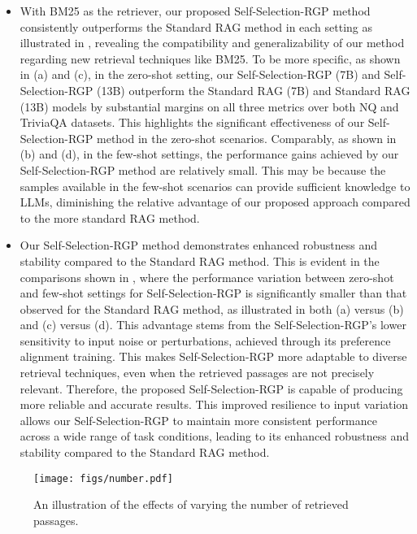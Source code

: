 \begin{itemize}[leftmargin=*,nosep]
\item  With BM25 as the retriever, our proposed Self-Selection-RGP method consistently outperforms the Standard RAG method in each setting as illustrated in , revealing the compatibility and generalizability of our method regarding new retrieval techniques like BM25.
To be more specific, as shown in  (a) and (c), in the zero-shot setting, our Self-Selection-RGP (7B) and Self-Selection-RGP (13B) outperform the Standard RAG (7B) and Standard RAG (13B) models by substantial margins on all three metrics over both NQ and TriviaQA datasets. 
This highlights the significant effectiveness of our Self-Selection-RGP method in the zero-shot scenarios.
Comparably, as shown in  (b) and (d), in the few-shot settings, the performance gains achieved by our Self-Selection-RGP method are relatively small. 
This may be because the samples available in the few-shot scenarios can provide sufficient knowledge to LLMs, diminishing the relative advantage of our proposed approach compared to the more standard RAG method.

\item Our Self-Selection-RGP method demonstrates enhanced robustness and stability compared to the Standard RAG method. 
This is evident in the comparisons shown in , where the performance variation between zero-shot and few-shot settings for Self-Selection-RGP is significantly smaller than that observed for the Standard RAG method, as illustrated in both (a) versus (b) and (c) versus (d). 
This advantage stems from the Self-Selection-RGP's lower sensitivity to input noise or perturbations, achieved through its preference alignment training.
This makes Self-Selection-RGP more adaptable to diverse retrieval techniques, even when the retrieved passages are not precisely relevant. 
Therefore, the proposed Self-Selection-RGP is capable of producing more reliable and accurate results.
This improved resilience to input variation allows our Self-Selection-RGP to maintain more consistent performance across a wide range of task conditions, leading to its enhanced robustness and stability compared to the Standard RAG method. 
\end{itemize}

\begin{figure}[t]
\setlength\abovecaptionskip{-0.3px}
\setlength\belowcaptionskip{-8px}
  \centering
  \texttt{[image: figs/number.pdf]}
  \caption{An illustration of the effects of varying the number of retrieved passages. } 
  \label{fig:num_passage}
  \vspace{-0.2cm}
\end{figure}


